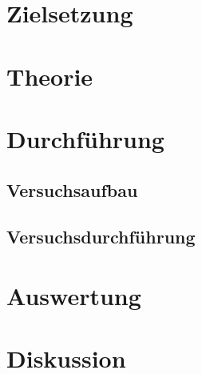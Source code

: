 \maketitle
\tableofcontents
\newpage

\section{Zielsetzung}

\section{Theorie}

\section{Durchführung}

\subsection{Versuchsaufbau}

\subsection{Versuchsdurchführung}

\section{Auswertung}

\section{Diskussion}
\newpage
\nocite{*}
\printbibliography
